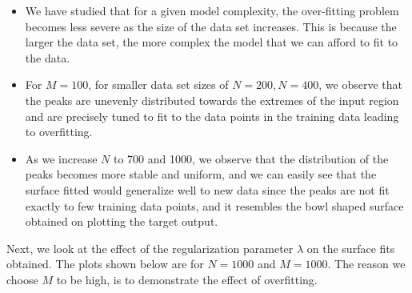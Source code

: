 \documentclass{article}
\begin{document}
\begin{itemize}
\item We have studied that for a given model complexity, the over-fitting problem becomes less severe as the size of the data set increases. This is because the larger the data set, the more complex the model that we can afford to fit to the data.
\item For $M=100$, for smaller data set sizes of $N=200, N=400$, we observe that the peaks are unevenly distributed towards the extremes of the input region and are precisely tuned to fit to the data points in the training data leading to overfitting.
\item As we increase $N$ to 700 and 1000, we observe that the distribution of the peaks becomes more stable and uniform, and we can easily see that the surface fitted would generalize well to new data since the peaks are not fit exactly to few training data points, and it resembles the bowl shaped surface obtained on plotting the target output.
\end{itemize}

\begin{flushleft}
Next, we look at the effect of the regularization parameter $\lambda$ on the surface fits obtained. The plots shown below are for $N = 1000$ and $M = 1000$. The reason we choose $M$ to be high, is to demonstrate the effect of overfitting.

\end{flushleft}
\end{document}
